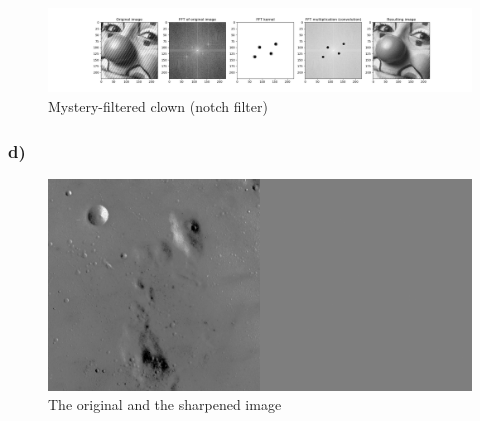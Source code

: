 \begin{figure}[]
    \centering
    \includegraphics[width=1.00\textwidth]{figures/image_processed/clown_filtered_subplots.png}
    \caption{Mystery-filtered clown (notch filter)}
    \label{fig:clown_filtered}
\end{figure}

\subsubsection*{d)}

\begin{figure}[]
    \centering
    \includegraphics[width=1.00\textwidth]{figures/image_processed/moon_sharpened.png}
    \caption{The original and the sharpened image}
    \label{fig:moon_sharpened}
\end{figure}